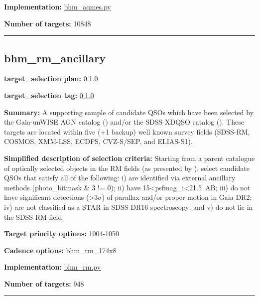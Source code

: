 \noindent\textbf{Implementation:}
\href{https://github.com/sdss/target_selection/blob/0.1.0/python/target_selection/cartons/bhm_aqmes.py}{bhm\_aqmes.py}

\noindent\textbf{Number of targets:} 10848

\begin{center}\rule{0.5\linewidth}{0.5pt}\end{center}

\hypertarget{bhm_rm_ancillary_plan0.1.0}{%
\subsection{bhm\_rm\_ancillary}\label{bhm_rm_ancillary_plan0.1.0}}

\noindent\textbf{target\_selection plan:} 0.1.0

\noindent\textbf{target\_selection tag:}
\href{https://github.com/sdss/target_selection/tree/0.1.0/}{0.1.0}

\noindent\textbf{Summary:} A supporting sample of candidate QSOs which have been
selected by the Gaia-unWISE AGN catalog
(\citealt{Shu2019}) and/or the SDSS XDQSO catalog
(\citealt{Bovy2011}). These targets are located within five (+1 backup) well
known survey fields (SDSS-RM, COSMOS, XMM-LSS, ECDFS, CVZ-S/SEP, and
ELIAS-S1).

\noindent\textbf{Simplified description of selection criteria:} Starting from a
parent catalogue of optically selected objects in the RM fields (as
presented by
\citealt{Yang2022}), select candidate QSOs that satisfy all of the
following: i) are identified via external ancillary methods
(photo\_bitmask \& 3 != 0); ii) have
15\textless psfmag\_i\textless21.5~AB; iii) do not have significant
detections (\textgreater3$\sigma$) of parallax and/or proper motion in Gaia
DR2; iv) are not classified as a STAR in SDSS DR16 spectroscopy; and v)
do not lie in the SDSS-RM field


\noindent\textbf{Target priority options:} 1004-1050

\noindent\textbf{Cadence options:} bhm\_rm\_174x8

\noindent\textbf{Implementation:}
\href{https://github.com/sdss/target_selection/blob/0.1.0/python/target_selection/cartons/bhm_rm.py}{bhm\_rm.py}

\noindent\textbf{Number of targets:} 948

\begin{center}\rule{0.5\linewidth}{0.5pt}\end{center}

